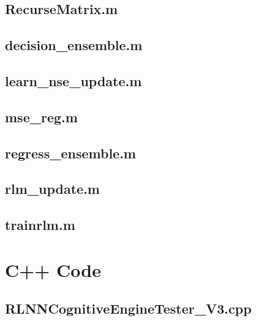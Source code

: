 \begin{appendices}
\section{RecurseMatrix.m}\label{app:MatlabCode:recurseMatrix}

\clearpage
\section{decision\_ensemble.m}\label{app:MatlabCode:decisionEnsemble}

\clearpage
\section{learn\_nse\_update.m}\label{app:MatlabCode:learnNSEUpdate}

\clearpage
\section{mse\_reg.m}\label{app:MatlabCode:mseReg}

\section{regress\_ensemble.m}\label{app:MatlabCode:regressEnsemble}

\clearpage
\section{rlm\_update.m}\label{app:MatlabCode:rlmUpdate}

\clearpage
\section{trainrlm.m}\label{app:MatlabCode:trainrlm}

\clearpage

\chapter{C++ Code} \label{app:CppCode}
\section{RLNNCognitiveEngineTester\_V3.cpp}\label{app:CppCode:cogEngTesterV3}

\clearpage

\end{appendices}
